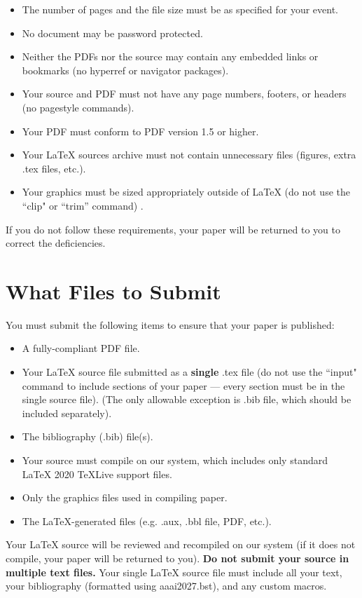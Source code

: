 \documentclass[letterpaper]{article} %
\begin{document}
\begin{itemize}
\item The number of pages and the file size must be as specified for your event.
\item No document may be password protected.
\item Neither the PDFs nor the source may contain any embedded links or bookmarks (no hyperref or navigator packages).
\item Your source and PDF must not have any page numbers, footers, or headers (no pagestyle commands).
\item Your PDF must conform to PDF version 1.5 or higher.
\item Your \LaTeX{} sources archive must not contain unnecessary files (figures, extra .tex files, etc.).
\item Your graphics must be sized appropriately outside of \LaTeX{} (do not use the ``clip" or ``trim'' command) .
\end{itemize}

If you do not follow these requirements, your paper will be returned to you to correct the deficiencies.

\section{What Files to Submit}
You must submit the following items to ensure that your paper is published:
\begin{itemize}
\item A fully-compliant PDF file.
\item Your \LaTeX{} source file submitted as a \textbf{single} .tex file (do not use the ``input" command to include sections of your paper --- every section must be in the single source file). (The only allowable exception is .bib file, which should be included separately).
\item The bibliography (.bib) file(s).
\item Your source must compile on our system, which includes only standard \LaTeX{} 2020 TeXLive support files.
\item Only the graphics files used in compiling paper.
\item The \LaTeX{}-generated files (e.g. .aux,  .bbl file, PDF, etc.).
\end{itemize}

Your \LaTeX{} source will be reviewed and recompiled on our system (if it does not compile, your paper will be returned to you). \textbf{Do not submit your source in multiple text files.} Your single \LaTeX{} source file must include all your text, your bibliography (formatted using aaai2027.bst), and any custom macros.
\end{document}
